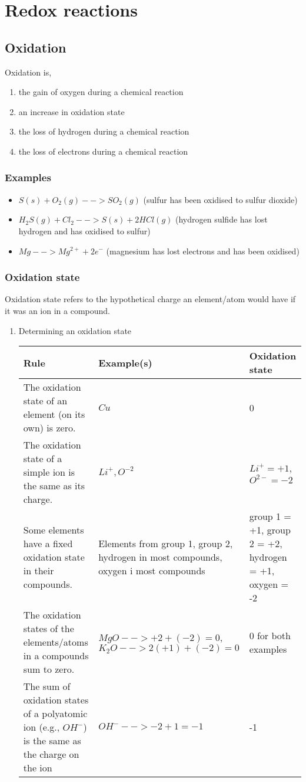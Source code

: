 \documentclass[11pt]{article}
\begin{document}
\section{Redox reactions}
\label{sec:org33dda13}
\subsection{Oxidation}
\label{sec:org1305b44}
Oxidation is,
\begin{enumerate}
\item the gain of oxygen during a chemical reaction
\item an increase in oxidation state
\item the loss of hydrogen during a chemical reaction
\item the loss of electrons during a chemical reaction
\end{enumerate}
\subsubsection{Examples}
\label{sec:orgadd6a07}
\begin{itemize}
\item \(S(s) + O_2(g) --> SO_2(g)\) (sulfur has been oxidised to sulfur dioxide)
\item \(H_2S(g) + Cl_2 --> S(s) + 2HCl(g)\) (hydrogen sulfide has lost hydrogen and has oxidised to sulfur)
\item \(Mg --> Mg^{2+} + 2e^-\) (magnesium has lost electrons and has been oxidised)
\end{itemize}
\subsubsection{Oxidation state}
\label{sec:org74c5360}
Oxidation state refers to the hypothetical charge an element/atom would have if it was an ion in a compound.
\begin{enumerate}
\item Determining an oxidation state
\label{sec:org11c3bf3}
\begin{center}
\begin{tabular}{lll}
Rule & Example(s) & Oxidation state\\
\hline
The oxidation state of an element (on its own) is zero. & \(Cu\) & 0\\
The oxidation state of a simple ion is the same as its charge. & \(Li^+, O^{-2}\) & \(Li^+=+1\), \(O^{2-}=-2\)\\
Some elements have a fixed oxidation state in their compounds. & Elements from group 1, group 2, hydrogen in most compounds, oxygen i most compounds & group 1 = +1, group 2 = +2, hydrogen = +1, oxygen = -2\\
The oxidation states of the elements/atoms in a compounds sum to zero. & \(MgO --> +2 + (-2) = 0\), \(K_2O --> 2(+1) + (-2) = 0\) & 0 for both examples\\
The sum of oxidation states of a polyatomic ion (e.g., \(OH^-\)) is the same as the charge on the ion & \(OH^- --> -2 + 1 = -1\) & -1\\
\end{tabular}
\end{center}
\end{enumerate}
\end{document}
